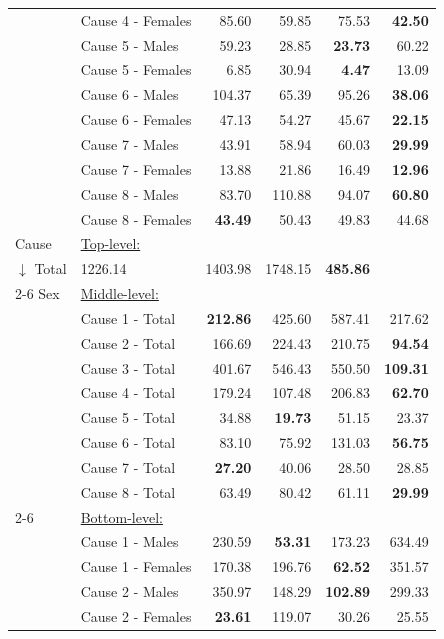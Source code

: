 \begin{center}
\begin{small}
\begin{longtable}{@{}llrrrr@{}}
& Cause 4 - Females & 85.60 & 59.85 & 75.53 & \textbf{42.50} \\
& Cause 5 - Males & 59.23 & 28.85 & \textbf{23.73} & 60.22 \\
& Cause 5 - Females & 6.85 & 30.94 & \textbf{4.47} & 13.09 \\
& Cause 6 - Males & 104.37 & 65.39 & 95.26 & \textbf{38.06} \\
& Cause 6 - Females & 47.13 & 54.27 & 45.67 & \textbf{22.15} \\
& Cause 7 - Males & 43.91 & 58.94 & 60.03 & \textbf{29.99} \\
& Cause 7 - Females & 13.88 & 21.86 & 16.49 & \textbf{12.96} \\
& Cause 8 - Males & 83.70 & 110.88 & 94.07 & \textbf{60.80} \\
& Cause 8 - Females & \textbf{43.49} & 50.43 & 49.83 & 44.68 \\
\midrule
Cause & \multicolumn{5}{l}{\underline{Top-level:}}\\
$\downarrow$  Total & 1226.14 & 1403.98 & 1748.15 & \textbf{485.86} \\
\cmidrule{2-6}
Sex & \multicolumn{5}{l}{\underline{Middle-level:}}\\
& Cause 1 - Total & \textbf{212.86} & 425.60 & 587.41 & 217.62 \\
& Cause 2 - Total & 166.69 & 224.43 & 210.75 & \textbf{94.54} \\
& Cause 3 - Total & 401.67 & 546.43 & 550.50 & \textbf{109.31} \\
& Cause 4 - Total & 179.24 & 107.48 & 206.83 & \textbf{62.70} \\
& Cause 5 - Total & 34.88 & \textbf{19.73} & 51.15 & 23.37 \\
& Cause 6 - Total & 83.10 & 75.92 & 131.03 & \textbf{56.75} \\
& Cause 7 - Total & \textbf{27.20} & 40.06 & 28.50 & 28.85 \\
& Cause 8 - Total & 63.49 & 80.42 & 61.11 & \textbf{29.99} \\
\cmidrule{2-6}
& \multicolumn{5}{l}{\underline{Bottom-level:}}\\
& Cause 1 - Males & 230.59 & \textbf{53.31} & 173.23 & 634.49 \\
& Cause 1 - Females & 170.38 & 196.76 & \textbf{62.52} & 351.57 \\
& Cause 2 - Males & 350.97 & 148.29 & \textbf{102.89} & 299.33 \\
& Cause 2 - Females & \textbf{23.61} & 119.07 & 30.26 & 25.55 \\

\end{longtable}
\end{small}
\end{center}
